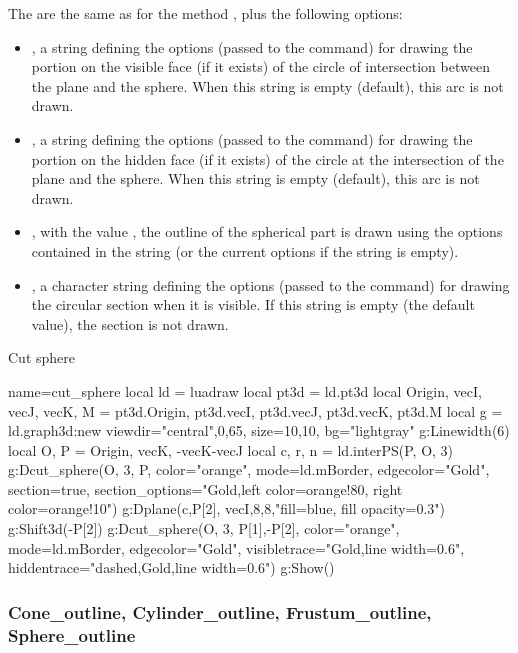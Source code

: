 The  are the same as for the method , plus the following options:
\begin{itemize}
    \item {}, a string defining the options (passed to the \drawcmd command) for drawing the portion on the visible face (if it exists) of the circle of intersection between the plane and the sphere. When this string is empty (default), this arc is not drawn.

    \item {}, a string defining the options (passed to the \drawcmd command) for drawing the portion on the hidden face (if it exists) of the circle at the intersection of the plane and the sphere. When this string is empty (default), this arc is not drawn.
    
    \item {}, with the value \true, the outline of the spherical part is drawn using the options contained in the string  (or the current options if the string is empty).
    
    \item {}, a character string defining the options (passed to the \drawcmd command) for drawing the circular section when it is visible. If this string is empty (the default value), the section is not drawn.
\end{itemize}

\begin{demo}{Cut sphere}
\begin{luadraw}{name=cut_sphere}
local ld = luadraw
local pt3d = ld.pt3d
local Origin, vecI, vecJ, vecK, M = pt3d.Origin, pt3d.vecI, pt3d.vecJ, pt3d.vecK, pt3d.M
local g = ld.graph3d:new{ viewdir={"central",0,65}, size={10,10}, bg="lightgray"}
g:Linewidth(6)
local O, P = Origin, {vecK, -vecK-vecJ}
local c, r, n = ld.interPS(P, {O, 3})
g:Dcut_sphere(O, 3, P, {color="orange", mode=ld.mBorder, edgecolor="Gold", section=true,
    section_options="Gold,left color=orange!80, right color=orange!10"})
g:Dplane({c,P[2]}, vecI,8,8,"fill=blue, fill opacity=0.3")
g:Shift3d(-P[2])
g:Dcut_sphere(O, 3, {P[1],-P[2]}, 
    {color="orange", mode=ld.mBorder, edgecolor="Gold", visibletrace="Gold,line width=0.6",
     hiddentrace="dashed,Gold,line width=0.6"})
g:Show()
\end{luadraw}
\end{demo}



\subsubsection{Cone\_outline, Cylinder\_outline, Frustum\_outline, Sphere\_outline}

